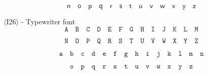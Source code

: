 \documentclass{book}
\begin{document}
\[\mathit{\mathbf{\mathsf{n}}}\quad \mathit{\mathbf{\mathsf{o}}}\quad \mathit{\mathbf{\mathsf{p}}}\quad 
\mathit{\mathbf{\mathsf{q}}}\quad \mathit{\mathbf{\mathsf{r}}}\quad \mathit{\mathbf{\mathsf{s}}}\quad 
\mathit{\mathbf{\mathsf{t}}}\quad \mathit{\mathbf{\mathsf{u}}}\quad \mathit{\mathbf{\mathsf{v}}}\quad 
\mathit{\mathbf{\mathsf{w}}}\quad \mathit{\mathbf{\mathsf{x}}}\quad \mathit{\mathbf{\mathsf{y}}}\quad 
\mathit{\mathbf{\mathsf{z}}}\]

$\langle$I26$\rangle$  - Typewriter font
\[\mathtt{A}\quad \mathtt{B}\quad \mathtt{C}\quad \mathtt{D}\quad
\mathtt{E}\quad \mathtt{F}\quad \mathtt{G}\quad \mathtt{H}\quad 
\mathtt{I}\quad \mathtt{J}\quad \mathtt{K}\quad \mathtt{L}\quad 
\mathtt{M}\]

\[\mathtt{N}\quad \mathtt{O}\quad \mathtt{P}\quad 
\mathtt{Q}\quad \mathtt{R}\quad \mathtt{S}\quad \mathtt{T}\quad 
\mathtt{U}\quad \mathtt{V}\quad \mathtt{W}\quad \mathtt{X}\quad 
\mathtt{Y}\quad \mathtt{Z}\]

\[\mathtt{a}\quad \mathtt{b}\quad
\mathtt{c}\quad \mathtt{d}\quad \mathtt{e}\quad \mathtt{f}\quad 
\mathtt{g}\quad \mathtt{h}\quad \mathtt{i}\quad \mathtt{j}\quad 
\mathtt{k}\quad \mathtt{l}\quad \mathtt{m}\quad \mathtt{n}\]

\[\mathtt{o}\quad \mathtt{p}\quad \mathtt{q}\quad \mathtt{r}\quad 
\mathtt{s}\quad \mathtt{t}\quad \mathtt{u}\quad \mathtt{v}\quad 
\mathtt{w}\quad \mathtt{x}\quad \mathtt{y}\quad \mathtt{z}\]
\end{document}
